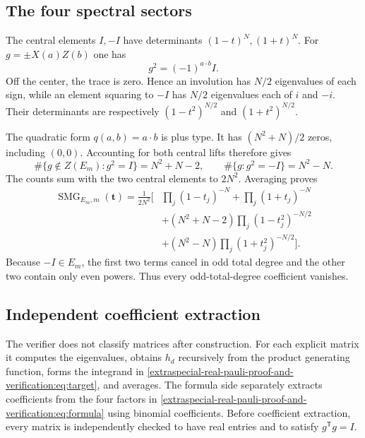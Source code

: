 \documentclass[10pt]{article}
\newcommand{\SMG}{\operatorname{SMG}}
\newcommand{\MGF}{\SMG}
\begin{document}
\subsection{The four spectral sectors}
The central elements $I,-I$ have determinants $(1-t)^N,(1+t)^N$.
For $g=\pm X(a)Z(b)$ one has
\[
 g^2=(-1)^{a\cdot b}I.
\]
Off the center, the trace is zero.  Hence an involution has $N/2$ eigenvalues
of each sign, while an element squaring to $-I$ has $N/2$ eigenvalues each
of $i$ and $-i$.  Their determinants are respectively
$(1-t^2)^{N/2}$ and $(1+t^2)^{N/2}$.

The quadratic form $q(a,b)=a\cdot b$ is plus type.  It has
$(N^2+N)/2$ zeros, including $(0,0)$.  Accounting for both central lifts
therefore gives
\[
 \#\{g\notin Z(E_m):g^2=I\}=N^2+N-2,
 \qquad \#\{g:g^2=-I\}=N^2-N.
\]
The counts sum with the two central elements to $2N^2$.  Averaging proves
\begin{equation}\label{extraspecial-real-pauli-proof-and-verification:eq:formula}
\boxed{\begin{aligned}
\MGF_{E_m,m}(\mathbf t)=\frac1{2N^2}\Big[&
\prod_j(1-t_j)^{-N}+\prod_j(1+t_j)^{-N}\\
&+(N^2+N-2)\prod_j(1-t_j^2)^{-N/2}\\
&+(N^2-N)\prod_j(1+t_j^2)^{-N/2}\Big].
\end{aligned}}
\end{equation}
Because $-I\in E_m$, the first two terms cancel in odd total degree and the
other two contain only even powers.  Thus every odd-total-degree coefficient
vanishes.

\subsection{Independent coefficient extraction}
The verifier does not classify matrices after construction.  For each
explicit matrix it computes the eigenvalues, obtains $h_d$ recursively from
the product generating function, forms the integrand in \eqref{extraspecial-real-pauli-proof-and-verification:eq:target},
and averages.  The formula side separately extracts coefficients from the
four factors in \eqref{extraspecial-real-pauli-proof-and-verification:eq:formula} using binomial coefficients.
Before coefficient extraction, every matrix is independently checked to have
real entries and to satisfy $g^{\mathsf T}g=I$.
\end{document}
